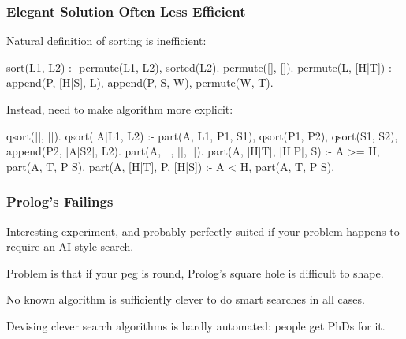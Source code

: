 \documentclass{plt}
\begin{document}
\begin{frame}[fragile]
  \frametitle{Elegant Solution Often Less Efficient}

Natural definition of sorting is inefficient:

\begin{prolog}
sort(L1, L2) :- permute(L1, L2), sorted(L2).
permute([], []).
permute(L, [H|T]) :-
  append(P, [H|S], L), append(P, S, W), permute(W, T).
\end{prolog}

Instead, need to make algorithm more explicit:

\begin{prolog}
qsort([], []).
qsort([A|L1, L2) :- part(A, L1, P1, S1),
  qsort(P1, P2), qsort(S1, S2), append(P2, [A|S2], L2).
part(A, [], [], []).
part(A, [H|T], [H|P], S) :- A >= H, part(A, T, P S).
part(A, [H|T], P, [H|S]) :- A < H, part(A, T, P S).
\end{prolog}

\end{frame}

\begin{frame}
  \frametitle{Prolog's Failings}

Interesting experiment, and probably perfectly-suited if your problem
happens to require an AI-style search.

Problem is that if your peg is round, Prolog's square hole is
difficult to shape.

No known algorithm is sufficiently clever to do smart searches in all
cases.

Devising clever search algorithms is hardly automated: people get
PhDs for it.

\end{frame}
\end{document}
